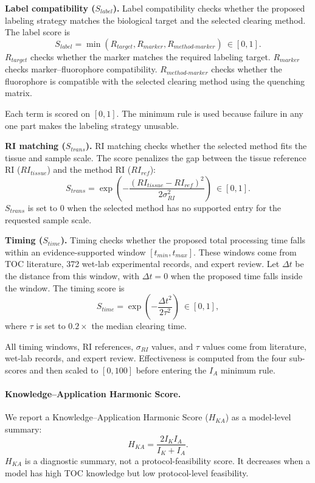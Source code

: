 \documentclass[conference]{IEEEtran}
\begin{document}
\noindent\textbf{Label compatibility ($S_{label}$).}
Label compatibility checks whether the proposed labeling strategy matches the
biological target and the selected clearing method. The label score is
\begin{equation}
S_{label}
= \min(R_{target}, R_{marker}, R_{method\text{-}marker})\ \in[0,1].
\end{equation}
$R_{target}$ checks whether the marker matches the required labeling target.
$R_{marker}$ checks marker--fluorophore compatibility.
$R_{method\text{-}marker}$ checks whether the fluorophore is compatible with the
selected clearing method using the quenching matrix. 

Each term is scored on $[0,1]$. The minimum rule is used because failure in any one part makes the labeling strategy
unusable.

\noindent\textbf{RI matching ($S_{trans}$).}
RI matching checks whether the selected method
fits the tissue and sample scale. The score penalizes the gap between the
tissue reference RI ($RI_{tissue}$) and the method RI ($RI_{ref}$):
\begin{equation}
S_{trans}
= \exp\left(
-\frac{(RI_{tissue}-RI_{ref})^2}{2\sigma_{RI}^2}
\right)\ \in[0,1].
\end{equation}
$S_{trans}$ is set to $0$ when the selected method has no supported entry for
the requested sample scale.

\noindent\textbf{Timing ($S_{time}$).}
Timing checks whether the proposed total processing time falls within an
evidence-supported window $[t_{min},t_{max}]$. These windows come from TOC
literature, 372 wet-lab experimental records, and expert review. Let $\Delta t$
be the distance from this window, with $\Delta t=0$ when the proposed time falls
inside the window. The timing score is
\begin{equation}
S_{time}
= \exp\left(
-\frac{\Delta t^2}{2\tau^2}
\right)\ \in[0,1],
\end{equation}
where $\tau$ is set to $0.2\times$ the median clearing time.

All timing windows, RI references, $\sigma_{RI}$ values, and $\tau$ values come
from literature, wet-lab records, and expert review. Effectiveness is computed from the four
sub-scores and then scaled to $[0,100]$ before entering the $I_A$
minimum rule.

\paragraph{Knowledge--Application Harmonic Score.}
We report a Knowledge--Application Harmonic Score ($H_{KA}$) as a model-level
summary:
\begin{equation}
H_{KA} = \frac{2 I_K I_A}{I_K + I_A}.
\end{equation}
$H_{KA}$ is a diagnostic summary, not a protocol-feasibility score. It decreases
when a model has high TOC knowledge but low protocol-level feasibility.
\end{document}
